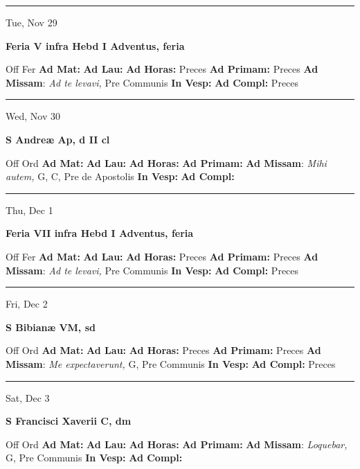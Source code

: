 \documentclass[letterpaper, 10pt]{article}
\begin{document}
\hrule
\begin{center}
Tue, Nov 29
\end{center}\textbf{ \large Feria V infra Hebd I Adventus, \textnormal{\normalsize feria}}
\begin{justify}
Off Fer
\textbf{Ad Mat: }
\textbf{Ad Lau: }
\textbf{Ad Horas: }Preces
\textbf{Ad Primam: }Preces
\textbf{Ad Missam}: \textit{Ad te levavi,} Pre Communis
\textbf{In Vesp: }
\textbf{Ad Compl: }Preces\end{justify}



\hrule
\begin{center}
Wed, Nov 30
\end{center}\textbf{ \large S Andreæ Ap, \textnormal{\normalsize d II cl}}
\begin{justify}
Off Ord
\textbf{Ad Mat: }
\textbf{Ad Lau: }
\textbf{Ad Horas: }
\textbf{Ad Primam: }
\textbf{Ad Missam}: \textit{Mihi autem,} G, C, Pre de Apostolis
\textbf{In Vesp: }
\textbf{Ad Compl: }\end{justify}



\hrule
\begin{center}
Thu, Dec 1
\end{center}\textbf{ \large Feria VII infra Hebd I Adventus, \textnormal{\normalsize feria}}
\begin{justify}
Off Fer
\textbf{Ad Mat: }
\textbf{Ad Lau: }
\textbf{Ad Horas: }Preces
\textbf{Ad Primam: }Preces
\textbf{Ad Missam}: \textit{Ad te levavi,} Pre Communis
\textbf{In Vesp: }
\textbf{Ad Compl: }Preces\end{justify}



\hrule
\begin{center}
Fri, Dec 2
\end{center}\textbf{ \large S Bibianæ VM, \textnormal{\normalsize sd}}
\begin{justify}
Off Ord
\textbf{Ad Mat: }
\textbf{Ad Lau: }
\textbf{Ad Horas: }Preces
\textbf{Ad Primam: }Preces
\textbf{Ad Missam}: \textit{Me expectaverunt,} G, Pre Communis
\textbf{In Vesp: }
\textbf{Ad Compl: }Preces\end{justify}



\hrule
\begin{center}
Sat, Dec 3
\end{center}\textbf{ \large S Francisci Xaverii C, \textnormal{\normalsize dm}}
\begin{justify}
Off Ord
\textbf{Ad Mat: }
\textbf{Ad Lau: }
\textbf{Ad Horas: }
\textbf{Ad Primam: }
\textbf{Ad Missam}: \textit{Loquebar,} G, Pre Communis
\textbf{In Vesp: }
\textbf{Ad Compl: }\end{justify}
\end{document}
